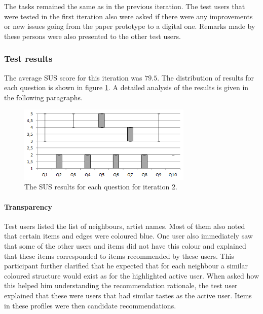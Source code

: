 The tasks remained the same as in the previous iteration. The test users that were tested in the first iteration also were asked if there were any improvements or new issues going from the paper prototype to a digital one. Remarks made by these persons were also presented to the other test users.


\subsubsection{Test results}\label{chapter:prototype:section:soundsuggest1:results}

The average SUS score for this iteration was $79.5$. The distribution of results for each question is shown in figure \ref{fig:iterations_sus_scores_it2_boxplots}. A detailed analysis of the results is given in the following paragraphs.

\begin{figure}
	\begin{center}
		\includegraphics[width=8.3cm]{img/iterations_sus_scores_it2_boxplots}
	\end{center}
	\caption{The SUS results for each question for iteration 2.}
	\label{fig:iterations_sus_scores_it2_boxplots}
\end{figure}

\paragraph{Transparency}

Test users listed the list of neighbours, artist names. Most of them also noted that certain items and edges were coloured blue. One user also immediately saw that some of the other users and items did not have this colour and explained that these items corresponded to items recommended by these users. This participant further clarified that he expected that for each neighbour a similar coloured structure would exist as for the highlighted active user. When asked how this helped him understanding the recommendation rationale, the test user explained that these were users that had similar tastes as the active user. Items in these profiles were then candidate recommendations.

